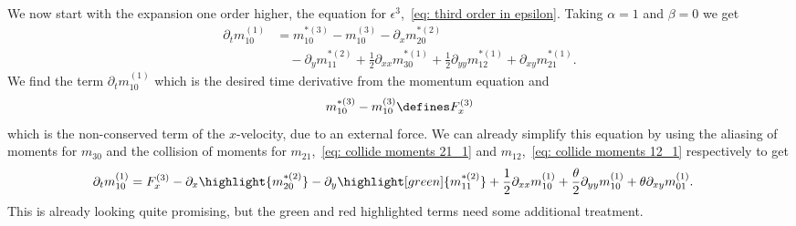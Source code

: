 We now start with the expansion one order higher, the equation for $\epsilon^3$,~\eqref{eq: third order in epsilon}.
Taking $\alpha=1$ and $\beta=0$ we get
\begin{equation}
  \begin{aligned}
     \partial_t m_{10}^{(1)} & =
    m_{10}^{*(3)} - m_{10}^{(3)} - \partial_x m_{20}^{*(2)} \\
    &\quad - \partial_y m_{11}^{*(2)} + \frac{1}{2}\partial_{xx} m_{30}^{*(1)} + \frac{1}{2} \partial_{yy} m_{12}^{*(1)} + \partial_{xy} m_{21}^{*(1)}.
  \end{aligned}
\end{equation}
We find the term $\partial_t m_{10}^{(1)} $ which is the desired time derivative from the momentum equation and
\begin{equation}
  m_{10}^{*(3)} - m_{10}^{(3)}\defines F_x^{(3)}
\end{equation}
which is the non-conserved term of the $x$-velocity, due to an external force.
We can already simplify this equation by using the aliasing of moments for $m_{30}$ and the collision of moments for $m_{21}$,~\eqref{eq: collide moments 21_1} and $m_{12}$,~\eqref{eq: collide moments 12_1} respectively to get
\begin{equation}
  \label{eq: start of momentum equation derivation}
  \begin{aligned}
    \partial_t m_{10}^{(1)} & =
    F_x^{(3)} - \partial_x \highlight{m_{20}^{*(2)}} - \partial_y \highlight[green]{m_{11}^{*(2)}} + \frac{1}{2}\partial_{xx} m_{10}^{(1)} + \frac{\theta}{2} \partial_{yy} m_{10}^{(1)} + \theta\partial_{xy} m_{01}^{(1)}.
  \end{aligned}
\end{equation}
This is already looking quite promising, but the green and red highlighted terms need some additional treatment.
